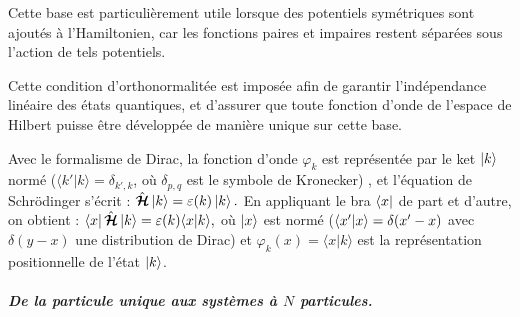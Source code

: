 \medskip

Cette base est particulièrement utile lorsque des potentiels symétriques sont ajoutés à l’Hamiltonien, car les fonctions paires et impaires restent séparées sous l’action de tels potentiels.

\smallskip

Cette condition d’orthonormalitée est imposée afin de garantir l’indépendance linéaire des états quantiques, et d'assurer que toute fonction d’onde de l’espace de Hilbert puisse être développée de manière unique sur cette base. 


\medskip

Avec le formalisme de Dirac, la fonction d’onde $\varphi_k$ est représentée par le ket $\ket{k}$ normé (\ie $\langle k' \vert k \rangle = \delta_{k', k}$, où $\delta_{p,q}$ est le symbole de Kronecker)
, et l’équation de Schrödinger s’écrit :
\(
\hat{\bm{\mathcal{H}}} \ket{k} = \varepsilon(k) \ket{k}.
\)
En appliquant le bra $\bra{x}$ de part et d’autre, on obtient :
\(
\bra{x} \hat{\bm{\mathcal{H}}} \ket{k} = \varepsilon(k) \langle x \vert k \rangle,
\)
où $\ket{x}$ est normé (\ie $\braket{x'\vert x} = \delta ( x' - x ) $ avec $\delta ( y - x )$ une distribution de Dirac) et $\varphi_k(x) = \langle x \vert k \rangle$ est la représentation positionnelle de l’état $\ket{k}$.




\subparagraph{De la particule unique aux systèmes à $N$ particules.}

